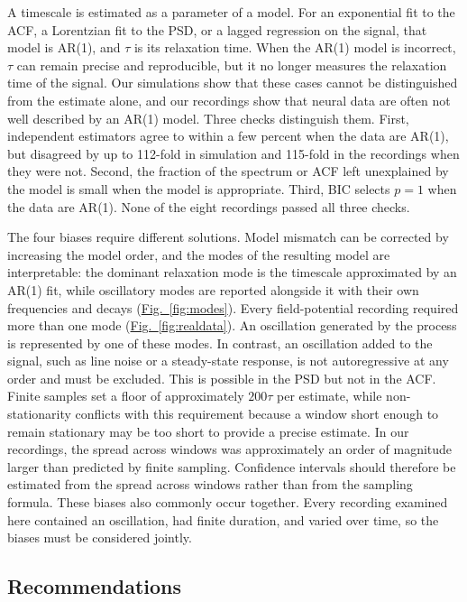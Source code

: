 \documentclass[pdflatex,lineno,sn-nature]{sn-jnl}
\newcommand{\figpanel}[3][]{\hyperref[#2]{Fig.~#1\ref*{#2}#3}}
\theoremstyle{thmstyleone}
\theoremstyle{thmstyletwo}
\theoremstyle{thmstylethree}
\begin{document}
A timescale is estimated as a parameter of a model. For an exponential fit to the ACF, a Lorentzian fit to the PSD, or a lagged regression on the signal, that model is AR(1), and $\tau$ is its relaxation time. When the AR(1) model is incorrect, $\tau$ can remain precise and reproducible, but it no longer measures the relaxation time of the signal. Our simulations show that these cases cannot be distinguished from the estimate alone, and our recordings show that neural data are often not well described by an AR(1) model. Three checks distinguish them. First, independent estimators agree to within a few percent when the data are AR(1), but disagreed by up to 112-fold in simulation and 115-fold in the recordings when they were not. Second, the fraction of the spectrum or ACF left unexplained by the model is small when the model is appropriate. Third, BIC selects $p = 1$ when the data are AR(1). None of the eight recordings passed all three checks.

The four biases require different solutions. Model mismatch can be corrected by increasing the model order, and the modes of the resulting model are interpretable: the dominant relaxation mode is the timescale approximated by an AR(1) fit, while oscillatory modes are reported alongside it with their own frequencies and decays (\figpanel{fig:modes}{}). Every field-potential recording required more than one mode (\figpanel{fig:realdata}{}). An oscillation generated by the process is represented by one of these modes. In contrast, an oscillation added to the signal, such as line noise or a steady-state response, is not autoregressive at any order and must be excluded. This is possible in the PSD but not in the ACF. Finite samples set a floor of approximately $200\tau$ per estimate, while non-stationarity conflicts with this requirement because a window short enough to remain stationary may be too short to provide a precise estimate. In our recordings, the spread across windows was approximately an order of magnitude larger than predicted by finite sampling. Confidence intervals should therefore be estimated from the spread across windows rather than from the sampling formula. These biases also commonly occur together. Every recording examined here contained an oscillation, had finite duration, and varied over time, so the biases must be considered jointly.

\subsection{Recommendations}
\end{document}
